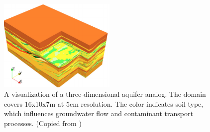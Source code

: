 \begin{figure}[!ht]
   \centering
   \includegraphics[width=0.5\textwidth]{./fig/herten.png} %
   \caption{A visualization of a three-dimensional aquifer analog. The domain covers 16x10x7m at 5cm resolution. The color indicates soil type, which influences groundwater flow and contaminant transport processes. (Copied from \cite{Comunian2011a})}
   \label{fig:herten}
\end{figure}


